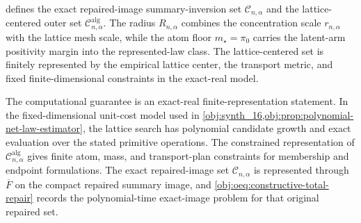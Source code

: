\documentclass[11pt]{article}
\begin{document}
 defines the exact repaired-image summary-inversion set \(\mathcal C_{n,\alpha}\) and the lattice-centered outer set \(\mathcal C^{\mathrm{alg}}_{n,\alpha}\). The radius \(R_{n,\alpha}\) combines the concentration scale \(r_{n,\alpha}\) with the lattice mesh scale, while the atom floor \(m_\star=\pi_0\) carries the latent-arm positivity margin into the represented-law class. The lattice-centered set is finitely represented by the empirical lattice center, the transport metric, and fixed finite-dimensional constraints in the exact-real model.

The computational guarantee is an exact-real finite-representation statement. In the fixed-dimensional unit-cost model used in \cref{obj:synth_16,obj:prop:polynomial-net-law-estimator}, the lattice search has polynomial candidate growth and exact evaluation over the stated primitive operations. The constrained representation of \(\mathcal C^{\mathrm{alg}}_{n,\alpha}\) gives finite atom, mass, and transport-plan constraints for membership and endpoint formulations. The exact repaired-image set \(\mathcal C_{n,\alpha}\) is represented through \(\overline F\) on the compact repaired summary image, and \cref{obj:oeq:constructive-total-repair} records the polynomial-time exact-image problem for that original repaired set.
\end{document}
